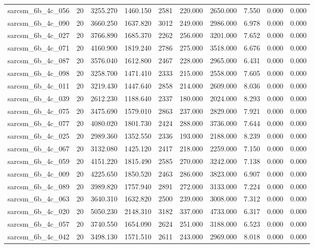 \begin{tabular}{lrrrrrrrrr}
sarcsm\_6b\_4c\_056 & 20 & 3255.270 & 1460.150 & 2581 & 220.000 & 2650.000 & 7.550 & 0.000 & 0.000 \\
sarcsm\_6b\_4c\_090 & 20 & 3660.250 & 1637.820 & 3012 & 249.000 & 2986.000 & 6.978 & 0.000 & 0.000 \\
sarcsm\_6b\_4c\_027 & 20 & 3766.890 & 1685.370 & 2262 & 256.000 & 3201.000 & 7.652 & 0.000 & 0.000 \\
sarcsm\_6b\_4c\_071 & 20 & 4160.900 & 1819.240 & 2786 & 275.000 & 3518.000 & 6.676 & 0.000 & 0.000 \\
sarcsm\_6b\_4c\_087 & 20 & 3576.040 & 1612.800 & 2467 & 228.000 & 2965.000 & 6.431 & 0.000 & 0.000 \\
sarcsm\_6b\_4c\_098 & 20 & 3258.700 & 1471.410 & 2333 & 215.000 & 2558.000 & 7.605 & 0.000 & 0.000 \\
sarcsm\_6b\_4c\_011 & 20 & 3219.430 & 1447.640 & 2858 & 214.000 & 2609.000 & 8.036 & 0.000 & 0.000 \\
sarcsm\_6b\_4c\_039 & 20 & 2612.230 & 1188.640 & 2337 & 180.000 & 2024.000 & 8.293 & 0.000 & 0.000 \\
sarcsm\_6b\_4c\_075 & 20 & 3475.690 & 1579.010 & 2863 & 237.000 & 2829.000 & 7.921 & 0.000 & 0.000 \\
sarcsm\_6b\_4c\_077 & 20 & 4080.020 & 1801.730 & 2424 & 288.000 & 3736.000 & 7.644 & 0.000 & 0.000 \\
sarcsm\_6b\_4c\_025 & 20 & 2989.360 & 1352.550 & 2336 & 193.000 & 2188.000 & 8.239 & 0.000 & 0.000 \\
sarcsm\_6b\_4c\_067 & 20 & 3132.080 & 1425.120 & 2417 & 218.000 & 2259.000 & 7.150 & 0.000 & 0.000 \\
sarcsm\_6b\_4c\_059 & 20 & 4151.220 & 1815.490 & 2585 & 270.000 & 3242.000 & 7.138 & 0.000 & 0.000 \\
sarcsm\_6b\_4c\_009 & 20 & 4225.650 & 1850.520 & 2463 & 286.000 & 3823.000 & 6.907 & 0.000 & 0.000 \\
sarcsm\_6b\_4c\_089 & 20 & 3989.820 & 1757.940 & 2891 & 272.000 & 3133.000 & 7.224 & 0.000 & 0.000 \\
sarcsm\_6b\_4c\_063 & 20 & 3640.310 & 1632.820 & 2500 & 239.000 & 3008.000 & 7.312 & 0.000 & 0.000 \\
sarcsm\_6b\_4c\_020 & 20 & 5050.230 & 2148.310 & 3182 & 337.000 & 4733.000 & 6.317 & 0.000 & 0.000 \\
sarcsm\_6b\_4c\_057 & 20 & 3740.550 & 1654.090 & 2624 & 251.000 & 3188.000 & 6.523 & 0.000 & 0.000 \\
sarcsm\_6b\_4c\_042 & 20 & 3498.130 & 1571.510 & 2611 & 243.000 & 2969.000 & 8.018 & 0.000 & 0.000 \\

\end{tabular}
